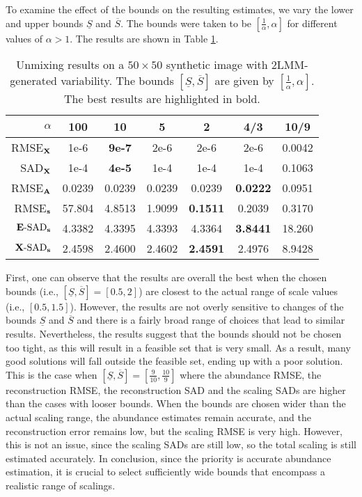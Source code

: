To examine the effect of the bounds on the resulting estimates, we vary the lower and upper bounds $\underline{S}$ and $\overline{S}$. 
The bounds were taken to be $\left[ \frac{1}{\alpha}, \alpha \right]$ for different values of $\alpha > 1$. The results are shown in Table \ref{tab:small image grf}.
\begin{table}[t]
\caption{Unmixing results on a  $50 \times 50$ synthetic image with 2LMM-generated variability. The bounds $[\underline{S}, \overline{S}]$ are given by $[\frac{1}{\alpha}, \alpha]$. The best results are highlighted in bold.}
\centering
        \begin{tabular}{|r|cccccc|}
        \hline
        $\alpha$    & 100    & 10              & 5      & 2               & 4/3             & 10/9   \\ \hline \hline
        RMSE$_{\mathbf{X}}$   & 1e-6   & \textbf{9e-7}   & 2e-6   & 2e-6            & 2e-6            & 0.0042 \\ \hline
        SAD$_{\mathbf{X}}$    & 1e-4   & \textbf{4e-5}   & 1e-4   & 1e-4            & 1e-4            & 0.1063 \\ \hline
        RMSE$_{\mathbf{A}}$   & 0.0239 & 0.0239          & 0.0239 & 0.0239          & \textbf{0.0222} & 0.0951 \\ \hline
        RMSE$_{\mathbf{s}}$   & 57.804 & 4.8513          & 1.9099 & \textbf{0.1511} & 0.2039          & 0.3170 \\ \hline
        $\mathbf{E}\text{-}\mathrm{SAD}_{\mathbf{s}}$     & 4.3382 & 4.3395          & 4.3393 & 4.3364          & \textbf{3.8441} & 18.260 \\ \hline
        $\mathbf{X}\text{-}\mathrm{SAD}_{\mathbf{s}}$     & 2.4598 & 2.4600          & 2.4602 & \textbf{2.4591} & 2.4976          & 8.9428 \\ \hline
        \end{tabular}
\label{tab:small image grf}
\end{table}
First, one can observe that the results are overall the best when the chosen bounds (i.e., $[\underline{S}, \overline{S}] = [0.5, 2]$) are closest to the actual range of scale values (i.e., $[0.5,1.5]$). However, the results
are not overly sensitive to changes of the bounds $\underline{S}$ and $\overline{S}$ and there is a fairly broad range of choices that lead to similar results. 
Nevertheless, the results suggest that the bounds should not be chosen too tight, as this will result in a feasible set that is very small. As a result, many good solutions will fall outside the feasible set, ending up with a poor solution. This is the case when $[\underline{S}, \overline{S}] = [\frac{9}{10}, \frac{10}{9}]$ where the abundance RMSE,  the reconstruction RMSE, the reconstruction SAD and the scaling SADs are higher than the cases with looser bounds.
When the bounds are chosen wider than the actual scaling range, the abundance estimates remain accurate, and the  reconstruction error remains low, but the scaling RMSE is very high. However, this is not an issue, since the scaling SADs are still low, so the total scaling is still estimated accurately.
In conclusion, since the priority is accurate abundance estimation, it is crucial to select sufficiently wide bounds that encompass a realistic range of scalings.

